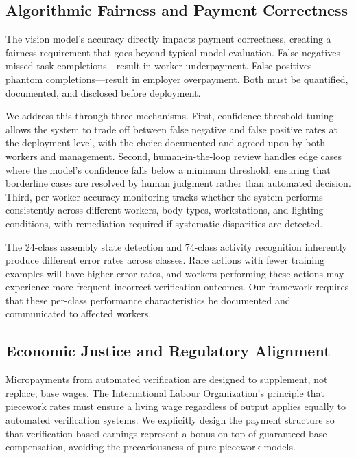 \documentclass[10pt,twocolumn]{article}
\begin{document}
\subsection{Algorithmic Fairness and Payment Correctness}

The vision model's accuracy directly impacts payment correctness, creating a fairness requirement that goes beyond typical model evaluation. False negatives---missed task completions---result in worker underpayment. False positives---phantom completions---result in employer overpayment. Both must be quantified, documented, and disclosed before deployment.

We address this through three mechanisms. First, confidence threshold tuning allows the system to trade off between false negative and false positive rates at the deployment level, with the choice documented and agreed upon by both workers and management. Second, human-in-the-loop review handles edge cases where the model's confidence falls below a minimum threshold, ensuring that borderline cases are resolved by human judgment rather than automated decision. Third, per-worker accuracy monitoring tracks whether the system performs consistently across different workers, body types, workstations, and lighting conditions, with remediation required if systematic disparities are detected.

The 24-class assembly state detection and 74-class activity recognition inherently produce different error rates across classes. Rare actions with fewer training examples will have higher error rates, and workers performing these actions may experience more frequent incorrect verification outcomes. Our framework requires that these per-class performance characteristics be documented and communicated to affected workers.

\subsection{Economic Justice and Regulatory Alignment}

Micropayments from automated verification are designed to supplement, not replace, base wages. The International Labour Organization's principle that piecework rates must ensure a living wage regardless of output applies equally to automated verification systems. We explicitly design the payment structure so that verification-based earnings represent a bonus on top of guaranteed base compensation, avoiding the precariousness of pure piecework models.
\end{document}
